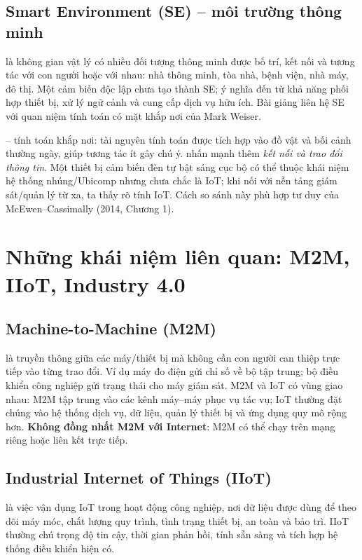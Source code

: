 \subsection{Smart Environment (SE) -- môi trường thông minh}
 là không gian vật lý có nhiều đối tượng thông minh được bố trí, kết nối và tương tác với con người hoặc với nhau: nhà thông minh, tòa nhà, bệnh viện, nhà máy, đô thị. Một cảm biến độc lập chưa tạo thành SE; ý nghĩa đến từ khả năng phối hợp thiết bị, xử lý ngữ cảnh và cung cấp dịch vụ hữu ích. Bài giảng liên hệ SE với quan niệm tính toán có mặt khắp nơi của Mark Weiser.

\begin{expandbox}
 -- tính toán khắp nơi: tài nguyên tính toán được tích hợp vào đồ vật và bối cảnh thường ngày, giúp tương tác ít gây chú ý.  nhấn mạnh thêm \textit{kết nối và trao đổi thông tin}. Một thiết bị cảm biến đèn tự bật sáng cục bộ có thể thuộc khái niệm hệ thống nhúng/Ubicomp nhưng chưa chắc là IoT; khi nối với nền tảng giám sát/quản lý từ xa, ta thấy rõ tính IoT. Cách so sánh này phù hợp tư duy của McEwen--Cassimally (2014, Chương 1).
\end{expandbox}

\section{Những khái niệm liên quan: M2M, IIoT, Industry 4.0}
\subsection{Machine-to-Machine (M2M)}
 là truyền thông giữa các máy/thiết bị mà không cần con người can thiệp trực tiếp vào từng trao đổi. Ví dụ máy đo điện gửi chỉ số về bộ tập trung; bộ điều khiển công nghiệp gửi trạng thái cho máy giám sát. M2M và IoT có vùng giao nhau: M2M tập trung vào các kênh máy--máy phục vụ tác vụ; IoT thường đặt chúng vào hệ thống dịch vụ, dữ liệu, quản lý thiết bị và ứng dụng quy mô rộng hơn. \textbf{Không đồng nhất M2M với Internet}: M2M có thể chạy trên mạng riêng hoặc liên kết trực tiếp.
\subsection{Industrial Internet of Things (IIoT)}
 là việc vận dụng IoT trong hoạt động công nghiệp, nơi dữ liệu được dùng để theo dõi máy móc, chất lượng quy trình, tình trạng thiết bị, an toàn và bảo trì. IIoT thường chú trọng độ tin cậy, thời gian phản hồi, tính sẵn sàng và tích hợp hệ thống điều khiển hiện có.
